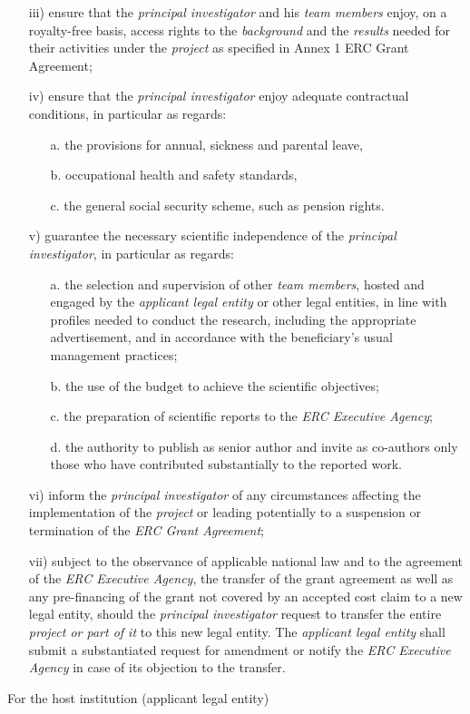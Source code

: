 \documentclass[a4paper,11pt,ngerman,numbers=noenddot]{scrreprt}
\begin{document}
\begin{itemize}
\begin{itemize}
\item[iii)] ensure that the \textit{principal investigator} and his \textit{team members} enjoy, on a royalty-free basis, access rights to the \textit{background} and the \textit{results} needed for their activities under the \textit{project} as specified in Annex 1 ERC Grant Agreement;
\item[iv)] ensure that the \textit{principal investigator} enjoy adequate contractual conditions, in particular as regards:
\begin{itemize}
\item[a.] the provisions for annual, sickness and parental leave,
\item[b.] occupational health and safety standards,
\item[c.] the general social security scheme, such as pension rights.
\end{itemize}
\item[v)] guarantee the necessary scientific independence of the \textit{principal investigator}, in particular as regards:
\begin{itemize}
\item[a.] the selection and supervision of other \textit{team members}, hosted and engaged by the \textit{applicant legal entity} or other legal entities, in line with profiles needed to conduct the research, including the appropriate advertisement, and in accordance with the beneficiary’s usual management practices;
\item[b.] the use of the budget to achieve the scientific objectives;
\item[c.] the preparation of scientific reports to the \textit{ERC Executive Agency};
\item[d.] the authority to publish as senior author and invite as co-authors only those who have contributed substantially to the reported work.
\end{itemize}
\item[vi)] inform the \textit{principal investigator} of any circumstances affecting the implementation of the \textit{project} or leading potentially to a suspension or termination of the \textit{ERC Grant Agreement};
\item[vii)] subject to the observance of applicable national law and to the agreement of the \textit{ERC Executive Agency}, the transfer of the grant agreement as well as any pre-financing of the grant not covered by an accepted cost claim to a new legal entity, should the \textit{principal investigator} request to transfer the entire \textit{project or part of it} to this new legal entity. The \textit{applicant legal entity} shall submit a substantiated request for amendment or notify the \textit{ERC Executive Agency} in case of its objection to the transfer.
\end{itemize}
\end{itemize}
\vspace{0.3cm}
For the host institution (applicant legal entity)\\[1.1cm]
\end{document}
